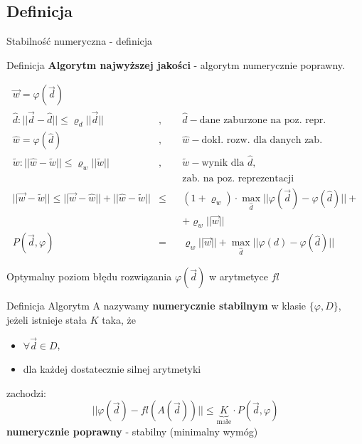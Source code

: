 \subsection{Definicja}
\begin{frame}{Stabilność numeryczna - definicja}
	\begin{block}{Definicja}
    	{\bf Algorytm najwyższej jakości} - algorytm numerycznie poprawny.
    \end{block}
    \vspace{-20pt}
    \begin{align*}
    	\vec{w} = \varphi(\vec{d}) &\\
        \hat{d}: ||\vec{d} - \hat{d}|| \le \varrho_d ||\vec{d} || &,&& 
        	\hat{d} - \text{dane zaburzone na poz. repr.} \\
        \hat{w} = \varphi(\hat{d}) &,&&
        	\hat{w} - \text{dokł. rozw. dla danych zab.} \\
		\tilde{w}: ||\hat{w} - \tilde{w} || \le \varrho_w ||\tilde{w}|| &,&&
        	\tilde{w} - \text{wynik dla $\hat{d}$,} \\
            &&&\text{zab. na poz. reprezentacji} \\
        ||\vec{w} - \tilde{w} || \le ||\vec{w} - \hat{w}|| + ||\hat{w} - \tilde{w}|| &\le&&
        	(1 + \varrho_w) \cdot \max_{\hat{d}} ||\varphi(\vec{d}) - \varphi(\hat{d})|| +\\
            &&&+ \varrho_w ||\vec{w}|| \\
        P(\vec{d}, \varphi) &=&& \varrho_w ||\vec{w}|| + \max_{\hat{d}} ||\varphi(d) - \varphi(\hat{d})||
    \end{align*}
\end{frame}
\begin{frame}{Optymalny poziom błędu rozwiązania $\varphi(\vec{d})$ w arytmetyce $fl$}
	\begin{block}{Definicja}
		Algorytm A nazywamy {\bf numerycznie stabilnym} w klasie $\{\varphi, D\}$, jeżeli istnieje stała $K$ taka, że 
        \begin{itemize}
        	\item $\forall \vec{d} \in D$,
            \item dla każdej dostatecznie silnej arytmetyki
        \end{itemize}
        zachodzi:
        \[
        	||\varphi(\vec{d}) - fl(A(\vec{d}))|| \le \underbrace{K}_\text{małe} \cdot P(\vec{d}, \varphi)
        \]
        {\bf numerycznie poprawny} - stabilny (minimalny wymóg)
	\end{block}
\end{frame}